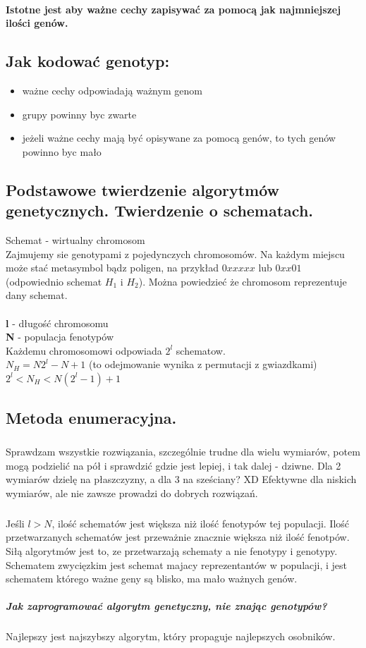 \documentclass{article}
\begin{document}
		\paragraph {Istotne jest aby ważne cechy zapisywać za pomocą jak najmniejszej
		ilości genów.}
		\subsection{Jak kodować genotyp:}
		\begin{itemize}
			\item ważne cechy odpowiadają ważnym genom
			\item grupy powinny byc zwarte
			\item jeżeli ważne cechy mają być opisywane za pomocą genów, to tych genów
			powinno byc mało
		\end{itemize}
		\subsection{Podstawowe twierdzenie algorytmów genetycznych. Twierdzenie o schematach.}
		Schemat - wirtualny chromosom \\
		Zajmujemy sie genotypami z pojedynczych chromosomów. Na każdym miejscu
		może stać metasymbol bądz poligen, na przykład ${0xxxxx}$ lub
		${0xx01}$ (odpowiednio schemat $H_1$ i $H_2$). Można powiedzieć że chromosom
		reprezentuje dany schemat.\\ \\
		\textbf{l} - długość chromosomu \\
		\textbf{N} - populacja fenotypów  \\
		Każdemu chromosomowi odpowiada $2^l$ schematow. \\
		$N_H=N2^l-N+1$ (to odejmowanie wynika z permutacji z gwiazdkami) \\
		$2^l  < N_H < N(2^l-1)+1$ \\
		
		\subsection{Metoda enumeracyjna.}
		\subparagraph{}
		Sprawdzam wszystkie rozwiązania,
		szczególnie trudne dla wielu wymiarów, potem mogą podzielić na pół i sprawdzić
		gdzie jest lepiej, i tak dalej - dziwne. Dla 2 wymiarów dzielę na płaszczyzny,
		a dla 3 na sześciany? XD Efektywne dla niskich wymiarów, ale nie zawsze prowadzi
		do dobrych rozwiązań. 
		\subparagraph{} Jeśli $l>N$, ilość schematów jest większa niż ilość fenotypów tej
		populacji. Ilość przetwarzanych schematów jest przeważnie znacznie większa niż
		ilość fenotpów. Siłą algorytmów jest to, ze przetwarzają schematy a nie fenotypy
		i genotypy. Schematem zwycięzkim jest schemat majacy reprezentantów w populacji,
		i jest schematem którego ważne geny są blisko, ma mało ważnych genów. 
		\subparagraph{Jak zaprogramować algorytm genetyczny, nie znając genotypów?} Najlepszy
		jest najszybszy algorytm, który propaguje najlepszych osobników.
\end{document}
